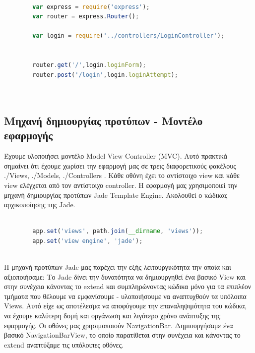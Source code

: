 		\begin{lstlisting}[language=Javascript]			
		
		var express = require('express');
		var router = express.Router(); 

		var login = require('../controllers/LoginController');


		router.get('/',login.loginForm); 
		router.post('/login',login.loginAttempt);
	
	
	 		\end{lstlisting}
	 		
	\subsection*{Μηχανή δημιουργίας προτύπων - Μοντέλο εφαρμογής }

		Έχουμε υλοποιήσει μοντέλο Model View Controller (MVC). Αυτό πρακτικά σημαίνει ότι έχουμε χωρίσει την εφαρμογή μας σε τρεις διαφορετικούς φακέλους  ./Views, ./Models, ./Controllers . Κάθε οθόνη έχει το αντίστοιχο view και κάθε view ελέγχεται από τον αντίστοιχο controller.  
		Η εφαρμογή μας χρησιμοποιεί την μηχανή δημιουργίας προτύπων Jade Template Engine. Ακολουθεί ο κώδικας αρχικοποίησης της Jade.
		
		\begin{lstlisting}[language=Javascript]			
		
		app.set('views', path.join(__dirname, 'views'));
		app.set('view engine', 'jade');
	
		\end{lstlisting}
		
	Η μηχανή προτύπων Jade μας παρέχει την εξής λειτουργικότητα την οποία και αξιοποιήσαμε: Το Jade δίνει την δυνατότητα να δημιουργηθεί ένα βασικό View και στην συνέχεια κάνοντας το extend και συμπληρώνοντας κώδικα μόνο για τα  επιπλέον τμήματα που θέλουμε να εμφανίσουμε - υλοποιήσουμε να αναπτυχθούν τα υπόλοιπα Views. Αυτό είχε ως αποτέλεσμα να αποφύγουμε την επαναληψιμότητα του κώδικα, να έχουμε καλύτερη δομή και οργάνωση και λιγότερο χρόνο ανάπτυξης της εφαρμογής. Οι οθόνες μας χρησιμοποιούν NavigationBar. Δημιουργήσαμε ένα βασικό NavigationBarView, το οποίο παρατίθεται στην συνέχεια και κάνοντας το extend αναπτύξαμε τις υπόλοιπες οθόνες.
	
